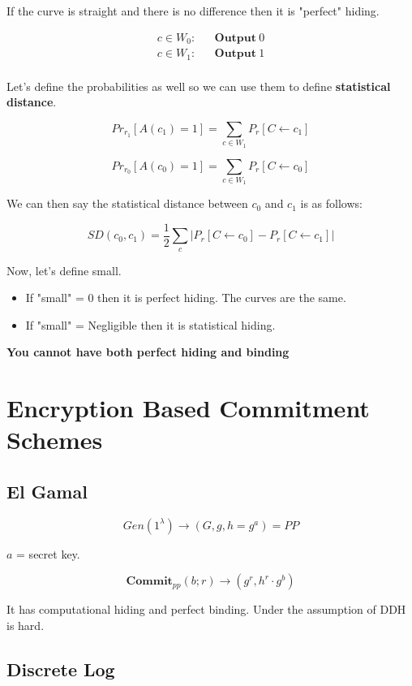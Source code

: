 \documentclass{article}
\begin{document}
If the curve is straight and there is no difference then it is "perfect" hiding. 

$$
\begin{matrix}
    c \in W_0: && \mathbf{Output} \: 0 \\
    c \in W_1: && \mathbf{Output} \: 1 \\
\end{matrix}
$$

Let's define the probabilities as well so we can use them to define \textbf{statistical distance}.

$$
Pr_{r_1} [A(c_1) = 1] = \sum_{c \in W_1} P_r[C \leftarrow c_1]
$$

$$
Pr_{r_0} [A(c_0) = 1] = \sum_{c \in W_1} P_r[C \leftarrow c_0]
$$

We can then say the statistical distance between $c_0$ and $c_1$ is as follows:

$$
SD(c_0, c_1) = \frac{1}{2} \sum_c |P_r[C \leftarrow c_0] - P_r[C \leftarrow c_1]|
$$

Now, let's define small.

\begin{itemize}
    \item If "small" = 0 then it is perfect hiding. The curves are the same.
    \item If "small" = Negligible then it is statistical hiding.
\end{itemize}

\textbf{You cannot have both perfect hiding and binding}

\section{Encryption Based Commitment Schemes}

\subsection{El Gamal}

$$
Gen(1^\lambda) \rightarrow (G,g,h = g^a) = PP
$$

$a$ = secret key.

$$
\mathbf{Commit}_{pp}(b;r) \rightarrow (g^r, h^r \cdot g^b)
$$

It has computational hiding and perfect binding. Under the assumption of DDH is hard.

\subsection{Discrete Log}
\end{document}
